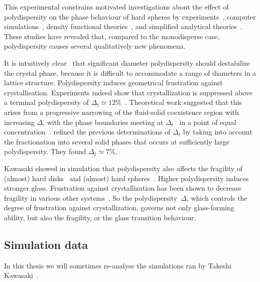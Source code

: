 This experimental constrains motivated investigations about the effect of polydispersity on the phase behaviour of hard spheres by experiments~\citep{pusey1986, pusey}, computer simulations~\citep{Dickinson1985, Bolhuis1996, Phan1998}, density functional theories~\citep{Barrat1986, McRae1988}, and simplified analytical theories~\citep{Barrat1986, Pusey1987, McRae1988, Bartlett1997, Sear1998, bartlett1999, Xu2003}. These studies have revealed that, compared to the monodisperse case, polydispersity causes several qualitatively new phenomena. 

It is intuitively clear~\citep{Pusey1987} that significant diameter polydispersity should destabilize the crystal phase, because it is difficult to accommodate a range of diameters in a lattice structure. Polydispersity induces geometrical frustration against crystallisation. Experiments indeed show that crystallization is suppressed above a terminal polydispersity of $\Delta_t \simeq 12\%$~\citep{pusey1986, pusey}. Theoretical work suggested that this arises from a progressive narrowing of the fluid-solid coexistence region with increasing $\Delta$, with the phase boundaries meeting at $\Delta_t$~\citep{McRae1988, Bartlett1997} in a point of equal concentration~\citep{bartlett1999}. \citet{Fasolo2003} refined the previous determinations of $\Delta_t$ by taking into account the fractionation into several solid phases that occurs at sufficiently large polydispersity. They found $\Delta_t \simeq 7\%$.

Kawasaki  showed in simulation that polydispersity also affects the fragility of (almost) hard disks~\citep{kawasaki2007cbd} and (almost) hard spheres~\citep{Kawasaki2010}. Higher polydispersity induces stronger glass. Frustration against crystallization has been shown to decrease fragility in various other systems~\citep{tarjus2005fba, Shintani2006, molinero2006tts, Coslovich2007, watanabe2008, tanaka2010critical}. So the polydispersity~$\Delta$, which controls the degree of frustration against crystallization, governs not only glass-forming ability, but also the fragility, or the glass transition behaviour.

\subsection{Simulation data}
\label{sec:sim_kawa}

In this thesis we will sometimes re-analyse the simulations ran by Takeshi Kawasaki~\citep{tanaka2010critical, Kawasaki2010}.

